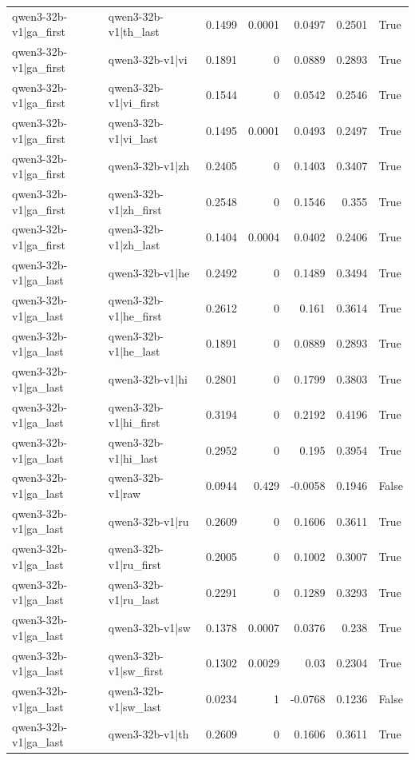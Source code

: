 \begin{table}
\begin{tabular}{l l r r r r l}
qwen3-32b-v1|ga_first & qwen3-32b-v1|th_last & 0.1499 & 0.0001 & 0.0497 & 0.2501 & True \\
qwen3-32b-v1|ga_first & qwen3-32b-v1|vi & 0.1891 & 0 & 0.0889 & 0.2893 & True \\
qwen3-32b-v1|ga_first & qwen3-32b-v1|vi_first & 0.1544 & 0 & 0.0542 & 0.2546 & True \\
qwen3-32b-v1|ga_first & qwen3-32b-v1|vi_last & 0.1495 & 0.0001 & 0.0493 & 0.2497 & True \\
qwen3-32b-v1|ga_first & qwen3-32b-v1|zh & 0.2405 & 0 & 0.1403 & 0.3407 & True \\
qwen3-32b-v1|ga_first & qwen3-32b-v1|zh_first & 0.2548 & 0 & 0.1546 & 0.355 & True \\
qwen3-32b-v1|ga_first & qwen3-32b-v1|zh_last & 0.1404 & 0.0004 & 0.0402 & 0.2406 & True \\
qwen3-32b-v1|ga_last & qwen3-32b-v1|he & 0.2492 & 0 & 0.1489 & 0.3494 & True \\
qwen3-32b-v1|ga_last & qwen3-32b-v1|he_first & 0.2612 & 0 & 0.161 & 0.3614 & True \\
qwen3-32b-v1|ga_last & qwen3-32b-v1|he_last & 0.1891 & 0 & 0.0889 & 0.2893 & True \\
qwen3-32b-v1|ga_last & qwen3-32b-v1|hi & 0.2801 & 0 & 0.1799 & 0.3803 & True \\
qwen3-32b-v1|ga_last & qwen3-32b-v1|hi_first & 0.3194 & 0 & 0.2192 & 0.4196 & True \\
qwen3-32b-v1|ga_last & qwen3-32b-v1|hi_last & 0.2952 & 0 & 0.195 & 0.3954 & True \\
qwen3-32b-v1|ga_last & qwen3-32b-v1|raw & 0.0944 & 0.429 & -0.0058 & 0.1946 & False \\
qwen3-32b-v1|ga_last & qwen3-32b-v1|ru & 0.2609 & 0 & 0.1606 & 0.3611 & True \\
qwen3-32b-v1|ga_last & qwen3-32b-v1|ru_first & 0.2005 & 0 & 0.1002 & 0.3007 & True \\
qwen3-32b-v1|ga_last & qwen3-32b-v1|ru_last & 0.2291 & 0 & 0.1289 & 0.3293 & True \\
qwen3-32b-v1|ga_last & qwen3-32b-v1|sw & 0.1378 & 0.0007 & 0.0376 & 0.238 & True \\
qwen3-32b-v1|ga_last & qwen3-32b-v1|sw_first & 0.1302 & 0.0029 & 0.03 & 0.2304 & True \\
qwen3-32b-v1|ga_last & qwen3-32b-v1|sw_last & 0.0234 & 1 & -0.0768 & 0.1236 & False \\
qwen3-32b-v1|ga_last & qwen3-32b-v1|th & 0.2609 & 0 & 0.1606 & 0.3611 & True \\

\end{tabular}
\end{table}
